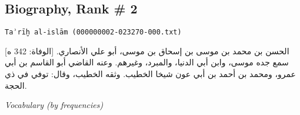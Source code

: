 \subsection*{Biography, Rank \# 2}

\tiny \begin{flushright}\texttt{Taʾrīḫ al-islām (000000002-023270-000.txt)}\end{flushright}

\begin{arab}[novoc]
\large \noindent الحسن بن محمد بن موسى بن إسحاق بن موسى، أبو علي الأنصاري. [الوفاة: 342 ه] سمع جده موسى، وابن أبي الدنيا، والمبرد، وغيرهم. وعنه القاضي أبو القاسم بن أبي عمرو، ومحمد بن أحمد بن أبي عون شيخا الخطيب. وثقه الخطيب، وقال: توفي في ذي الحجة.
\end{arab}

\normalsize
\begin{center}\textit{Vocabulary (by frequencies)}\end{center}
\footnotesize
